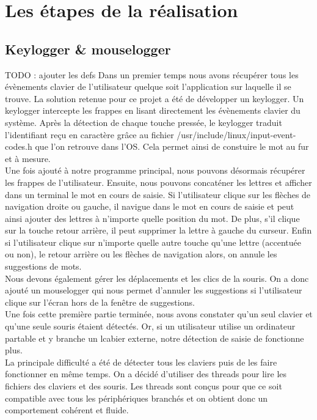 \documentclass[a4paper, 11pt]{report}
\begin{document}
\section{Les étapes de la réalisation}

\subsection{Keylogger \& mouselogger}
TODO : ajouter les defs 
Dans un premier temps nous avons récupérer tous les évènements clavier de l'utilisateur quelque soit l'application sur laquelle il se trouve. La solution retenue pour ce projet a été de développer un keylogger. Un keylogger intercepte les frappes en lisant directement les évènements clavier du système. Après la détection de chaque touche pressée, le keylogger traduit l'identifiant reçu en caractère grâce au fichier /usr/include/linux/input-event-codes.h que l'on retrouve dans l'OS. Cela permet ainsi de constuire le mot au fur et à mesure. \\

Une fois ajouté à notre programme principal, nous pouvons désormais récupérer les frappes de l'utilisateur. Ensuite, nous pouvons concaténer les lettres et afficher dans un terminal le mot en cours de saisie. Si l'utilisateur clique sur les flèches de navigation droite ou gauche, il navigue dans le mot en cours de saisie et peut ainsi ajouter des lettres à n'importe quelle position du mot. De plus, s'il clique sur la touche retour arrière, il peut supprimer la lettre à gauche du curseur. Enfin si l'utilisateur clique sur n'importe quelle autre touche qu'une lettre (accentuée ou non), le retour arrière ou les flèches de navigation alors, on annule les suggestions de mots. \\
Nous devons également gérer les déplacements et les clics de la souris. On a donc ajouté un mouselogger qui nous permet d'annuler les suggestions si l'utilisateur clique sur l'écran hors de la fenêtre de suggestions.\\

Une fois cette première partie terminée, nous avons constater qu'un seul clavier et qu'une seule souris étaient détectés. Or, si un utilisateur utilise un ordinateur partable et y branche un lcabier externe, notre détection de saisie de fonctionne plus. \\
La principale difficulté a été de détecter tous les claviers puis de les faire fonctionner en même temps. On a décidé d'utiliser des threads pour lire les fichiers des claviers et des souris. Les threads sont conçus pour que ce soit compatible avec tous les périphériques branchés et on obtient donc un comportement cohérent et fluide. \\
\end{document}
